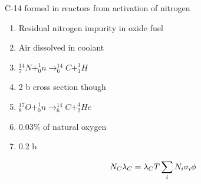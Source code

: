 \documentclass[aspectratio=1610,pdftex,dvipsnames,compress,xcolor={dvipsnames}]{beamer}
\begin{document}
\begin{frame}{C-14 formed in reactors from activation of nitrogen}
    \begin{enumerate}[series=outerlist,topsep=0pt,itemsep=11pt,leftmargin=*,label=(\arabic*)]
        \item[]Residual nitrogen impurity in oxide fuel
        \item[]Air dissolved in coolant
        \item[]$^{14}_7N+^1_0n \rightarrow ^{14}_6C+^1_1H$ 
        \item[]2 b cross section though
        \item[]$^{17}_8O+^1_0n \rightarrow ^{14}_6C+^4_2He$
        \item[]0.03\% of natural oxygen
        \item[]0.2 b 
    \end{enumerate}
    
    \vspace*{\fill}

    \begin{equation}
        \LARGE
        N_C\lambda_C=\lambda_CT\sum_i N_i \sigma_i \phi
    \end{equation}
\end{frame}
\end{document}
